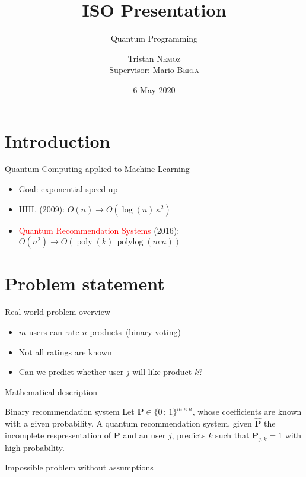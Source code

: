 \documentclass{beamer}
\title{ISO Presentation}
\subtitle{Quantum Programming}
\date{6 May 2020}
\author[Tristan \textsc{Nemoz}]{Tristan \textsc{Nemoz}\\{\small Supervisor: Mario \textsc{Berta}}}
\DeclareMathOperator{\polylog}{polylog}
\DeclareMathOperator{\poly}{poly}
\begin{document}
\begin{frame}
\maketitle
\end{frame}

\section{Introduction}

\begin{frame}{Quantum Computing applied to Machine Learning}
    \begin{itemize}
        \item Goal: exponential speed-up\pause
        \item HHL (2009): $O(n)\to O\left(\log(n)\,\kappa^2\right)$\pause
        \item \textcolor<4->{red}{Quantum Recommendation Systems} (2016): $O\left(n^2\right)\to O(\poly(k)\,\polylog(m\,n))$
    \end{itemize}
\end{frame}

\section{Problem statement}

\begin{frame}{Real-world problem overview}
    \begin{itemize}
        \item $m$ users can rate $n$ products\pause\ (binary voting)\pause
        \item Not all ratings are known\pause
        \item Can we predict whether user $j$ will like product $k$?
    \end{itemize}
\end{frame}

\begin{frame}{Mathematical description}
    \begin{block}{Binary recommendation system}
        Let $\mathbf{P}\in\{0\,;\,1\}^{m\times n}$, whose coefficients are known with a given probability. A quantum recommendation system, given $\hat{\mathbf{P}}$ the incomplete respresentation of $\mathbf{P}$ and an user $j$, predicts $k$ such that $\mathbf{P}_{j,k}=1$ with high probability.
    \end{block}\pause
    Impossible problem without assumptions
\end{frame}
\end{document}
